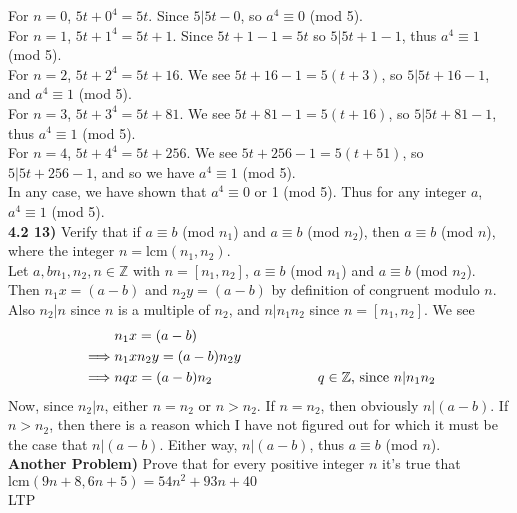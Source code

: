 \documentclass{scrartcl}
\begin{document}
For $n=0$, $5t+0^4=5t$. Since $5|5t-0$, so $a^4 \equiv 0$ (mod 5).\\

For $n=1$, $5t+1^4=5t+1$. Since $5t+1-1=5t$ so $5|5t+1-1$, thus $a^4 \equiv 1$ (mod 5).\\

For $n=2$, $5t+2^4=5t+16$. We see $5t+16-1=5(t+3)$, so $5|5t+16-1$, and $a^4 \equiv 1$ (mod 5).\\

For $n=3$, $5t+3^4=5t+81$. We see $5t+81-1=5(t+16)$, so $5|5t+81-1$, thus $a^4 \equiv 1$ (mod 5).\\

For $n=4$, $5t+4^4=5t+256$. We see $5t+256-1=5(t+51)$, so $5|5t+256-1$, and so we have $a^4 \equiv 1$ (mod 5).\\

In any case, we have shown that $a^4 \equiv 0$ or 1 (mod 5). Thus for any integer $a$, $a^4 \equiv 1$ (mod 5).\\

\textbf{4.2 13)} Verify that if $a \equiv b$ (mod $n_1$) and $a \equiv b$ (mod $n_2$), then $a \equiv b$ (mod $n$), where the integer $n=\text{lcm}(n_1,n_2)$.\\
 
Let $a,bn_1,n_2,n\in\mathbb{Z}$ with $n = [n_1,n_2]$, $a \equiv b$ (mod $n_1$) and $a \equiv b$ (mod $n_2$). Then $n_1x=(a-b)$ and $n_2y=(a-b)$ by definition of congruent modulo $n$. Also $n_2|n$ since $n$ is a multiple of $n_2$, and $n|n_1n_2$ since $n=[n_1,n_2]$. We see
\begin{align*}
  &n_1x = (a-b)\\
  \implies&n_1xn_2y = (a-b)n_2y\\
  \implies&nqx = (a-b)n_2 \text{\hspace{1in} $q\in\mathbb{Z}$, since $n | n_1n_2$}
\end{align*}
Now, since $n_2|n$, either $n=n_2$ or $n>n_2$. If $n=n_2$, then obviously $n|(a-b)$. If $n>n_2$, then there is a reason which I have not figured out for which it must be the case that $n|(a-b)$. Either way, $n|(a-b)$, thus $a \equiv b$ (mod $n$).\\

\textbf{Another Problem)} Prove that for every positive integer $n$ it's true that $\text{lcm}(9n+8,6n+5)=54n^2+93n+40$\\

LTP
\end{document}
